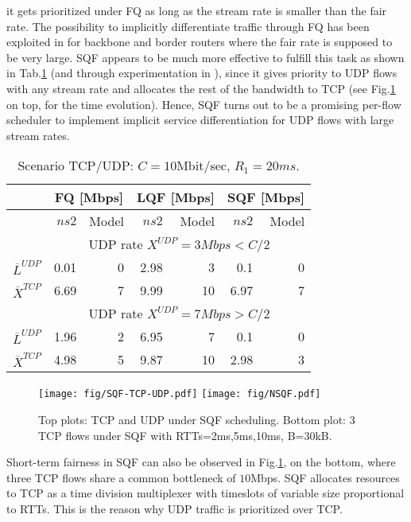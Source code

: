 \documentclass[a4paper,oneside, 11pt]{article}
\begin{document}
it gets prioritized under FQ as long as the stream rate is smaller than
the fair rate.
The possibility to implicitly differentiate traffic through FQ has been exploited in \cite{hpsr,ancs05} for backbone
and border routers where the fair rate is supposed to be very large. SQF appears to be much more effective
to fulfill this task as shown in Tab.\ref{tab:numerics2} (and through experimentation in \cite{ostallo}),
since it gives priority to UDP flows with any stream rate and allocates the rest of the bandwidth to TCP
(see Fig.\ref{fig:sqf-tcp-dup} on top, for the time evolution).
Hence, SQF turns out to be a promising per-flow scheduler to implement implicit service differentiation for UDP flows
with large stream rates.
\begin{table}
\centering
\begin{tabular}{|l|rr|rr|rr|}
\hline
& \multicolumn{2}{|c}{{FQ [Mbps]}} & \multicolumn{2}{|c}{{LQF [Mbps]}} &\multicolumn{2}{|c|}{{SQF [Mbps]}} \\
\hline
\hline
& $ns2$ & Model& $ns2$ & Model& $ns2$ & Model\\
& \multicolumn{6}{c|}{{UDP rate  $X^{UDP}=3Mbps<C/2$}}  \\
$\overline{L}^{UDP}$  & 0.01 & 0 &2.98  & 3 & 0.1 & 0 \\
$\overline{X}^{TCP}$  & 6.69 & 7 & 9.99& 10 & 6.97 & 7 \\
\hline
& \multicolumn{6}{c|}{{UDP rate  $X^{UDP}=7Mbps>C/2$}}  \\
$\overline{L}^{UDP}$  & 1.96 & 2 & 6.95 & 7 & 0.1 & 0 \\
$\overline{X}^{TCP}$  & 4.98 & 5 & 9.87 & 10 & 2.98 & 3 \\
\hline
\end{tabular}
\caption{Scenario TCP/UDP: $C=10$Mbit/sec, $R_1=20ms$.}
\label{tab:numerics2}
\end{table}

\begin{figure}[htbp]
\centering
\texttt{[image: fig/SQF-TCP-UDP.pdf]}
\texttt{[image: fig/NSQF.pdf]}
\caption{Top plots: TCP and UDP under SQF scheduling. Bottom plot: 3 TCP flows under SQF with RTTs=2ms,5ms,10ms, B=30kB.}
\label{fig:sqf-tcp-dup}
\end{figure}
Short-term fairness in SQF can also be observed in Fig.\ref{fig:sqf-tcp-dup}, on the bottom,
where three TCP flows share a common bottleneck of $10$Mbps.
SQF allocates resources to TCP as a time division multiplexer with timeslots of variable size
proportional to RTTs. This is the reason why UDP traffic is prioritized
over TCP.
\end{document}
